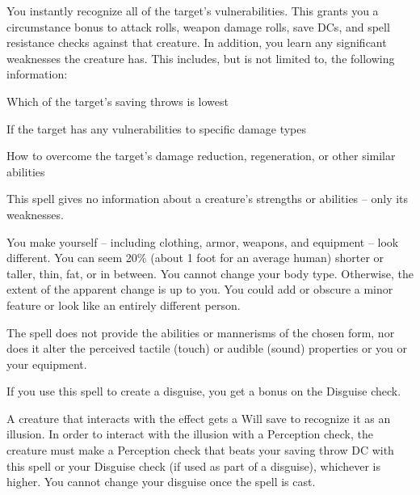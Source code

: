 \spellrng{\rngmed}
\begin{spelleffect}
  You instantly recognize all of the target's vulnerabilities. This grants you a  circumstance bonus to attack rolls, weapon damage rolls, save DCs, and spell resistance checks against that creature. In addition, you learn any significant weaknesses the creature has. This includes, but is not limited to, the following information:
  \begin{itemize*}
    \item Which of the target's saving throws is lowest
    \item If the target has any vulnerabilities to specific damage types
    \item How to overcome the target's damage reduction, regeneration, or other similar abilities
  \end{itemize*}
\end{spelleffect}
\begin{spellnotes}
  This spell gives no information about a creature's strengths or abilities -- only its weaknesses.
\end{spellnotes}

\spellrng{\rngpers}
\begin{spelleffect}
  You make yourself -- including clothing, armor, weapons, and equipment -- look different. You can seem 20\% (about 1 foot for an average human) shorter or taller, thin, fat, or in between. You cannot change your body type. Otherwise, the extent of the apparent change is up to you. You could add or obscure a minor feature or look like an entirely different person.
  \par The spell does not provide the abilities or mannerisms of the chosen form, nor does it alter the perceived tactile (touch) or audible (sound) properties or  you or your equipment. 
  \par If you use this spell to create a disguise, you get a  bonus on the Disguise check.
\end{spelleffect}
\begin{spellnotes}
  A creature that interacts with the effect gets a Will save to recognize it as an illusion. In order to interact with the illusion with a Perception check, the creature must make a Perception check that beats your saving throw DC with this spell or your Disguise check (if used as part of a disguise), whichever is higher. You cannot change your disguise once the spell is cast. 
\end{spellnotes}

